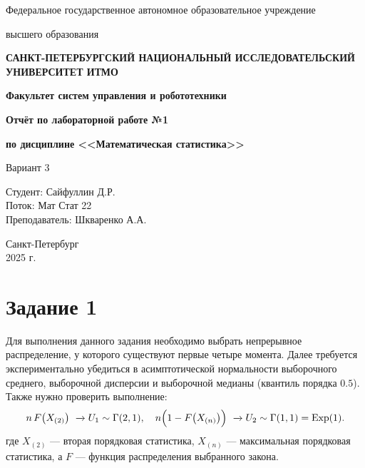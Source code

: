 \documentclass[a4paper,12pt]{article}
\begin{document}
\begin{titlepage}
    \centering
    {\large Федеральное государственное автономное образовательное учреждение\par}
    {\large высшего образования\par}
    {\bfseries САНКТ-ПЕТЕРБУРГСКИЙ НАЦИОНАЛЬНЫЙ ИССЛЕДОВАТЕЛЬСКИЙ УНИВЕРСИТЕТ ИТМО\par}
    {\bfseries Факультет систем управления и робототехники\par}
    \vfill
    {\Large \bfseries Отчёт по лабораторной работе №1\par}
    {\Large \bfseries по дисциплине <<Математическая статистика>>\par}
    {\Large Вариант 3\par}
    \vfill
    
    \begin{flushright}
        Студент: Сайфуллин Д.Р. \\
        Поток: Мат Стат 22 \\
        Преподаватель: Шкваренко А.А.
    \end{flushright}
    \vfill
    Санкт-Петербург \\
    2025 г.
\end{titlepage}

\section*{Задание 1}
Для выполнения данного задания необходимо выбрать непрерывное распределение, у которого существуют первые четыре момента. Далее требуется экспериментально убедиться в асимптотической нормальности выборочного среднего, выборочной дисперсии и выборочной медианы (квантиль порядка $0.5$). Также нужно проверить выполнение:
\[
    n\,F\bigl(X_{(2)}\bigr)
    \ \xrightarrow{} U_1 \sim \Gamma(2,1),
    \quad
    n\Bigl(1 - F\bigl(X_{(n)}\bigr)\Bigr)
    \ \xrightarrow{} U_2 \sim \Gamma(1, 1) = \mathrm{Exp}(1).
\]
где $X_{(2)}$ --- вторая порядковая статистика, $X_{(n)}$ --- максимальная порядковая статистика, а $F$ --- функция распределения выбранного закона.
\end{document}
